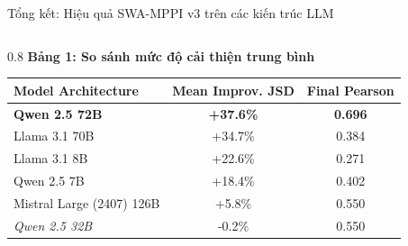 \documentclass[11pt, aspectratio=169]{beamer}
\begin{document}
\begin{frame}{Tổng kết: Hiệu quả SWA-MPPI v3 trên các kiến trúc LLM}
    
    \begin{columns}[T]
        \begin{column}{0.8\textwidth}
            \centering
            \scriptsize
            \textbf{Bảng 1: So sánh mức độ cải thiện trung bình}
            \vspace{0.2cm}
            \begin{tabular}{l c c}
                \toprule
                \textbf{Model Architecture} & \textbf{Mean Improv. JSD} & \textbf{Final Pearson} \\
                \midrule
                \textbf{Qwen 2.5 72B} & \textcolor{cbGreen}{\textbf{+37.6\%}} & \textbf{0.696} \\
                Llama 3.1 70B & \textcolor{cbGreen}{+34.7\%} & 0.384 \\
                Llama 3.1 8B & +22.6\% & 0.271 \\
                Qwen 2.5 7B & +18.4\% & 0.402 \\
                Mistral Large (2407) 126B & +5.8\% & 0.550 \\
                \textit{Qwen 2.5 32B} & \textcolor{alertred}{-0.2\%} & 0.550 \\
                \bottomrule
            \end{tabular}
            \vspace{0.4cm}
        \end{column}

    \end{columns}
\end{frame}
\end{document}
